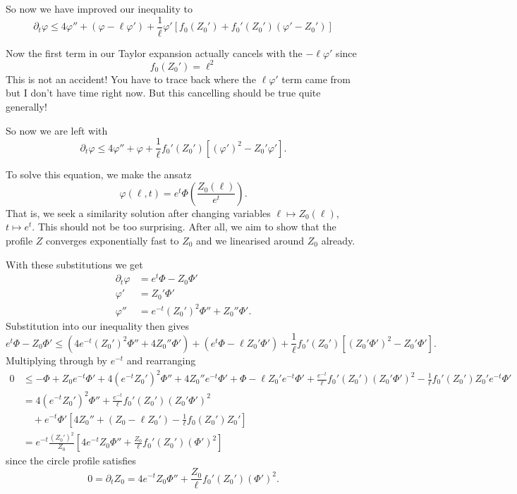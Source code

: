 \documentclass{amsart}
\begin{document}
So now we have improved our inequality to
\[
\partial_t \varphi \leq 4 \varphi'' + (\varphi - \ell \varphi') + \frac{1}{\ell} \varphi' \left[f_0(Z_0') + f_0'(Z_0')(\varphi' - Z_0')\right]
\]

Now the first term in our Taylor expansion actually cancels with the \(-\ell\varphi'\) since
\[
f_0(Z_0') = \ell^2
\]
This is not an accident! You have to trace back where the \(\ell\varphi'\) term came from but I don't have time right now. But this cancelling should be true quite generally!

So now we are left with
\[
\partial_t \varphi \leq 4 \varphi'' + \varphi + \frac{1}{\ell} f_0'(Z_0')[(\varphi')^2 - Z_0'\varphi'].
\]

To solve this equation, we make the ansatz
\[
\varphi(\ell, t) = e^t \Phi\left(\frac{Z_0(\ell)}{e^t}\right).
\]
That is, we seek a similarity solution after changing variables \(\ell \mapsto Z_0(\ell)\), \(t \mapsto e^t\). This should not be too surprising. After all, we aim to show that the profile \(Z\) converges exponentially fast to \(Z_0\) and we linearised around \(Z_0\) already.

With these substitutions we get
\begin{align*}
\partial_t \varphi &= e^t \Phi - Z_0 \Phi' \\
\varphi' &= Z_0' \Phi' \\
\varphi'' &= e^{-t} (Z_0')^2 \Phi'' + Z_0'' \Phi'.
\end{align*}
Substitution into our inequality then gives
\[
e^t \Phi - Z_0 \Phi' \leq (4 e^{-t} (Z_0')^2 \Phi'' + 4 Z_0'' \Phi') + (e^t \Phi - \ell Z_0' \Phi') + \frac{1}{\ell} f_0'(Z_0')[(Z_0' \Phi')^2 - Z_0'\Phi'].
\]
Multiplying through by \(e^{-t}\) and rearranging
\[
\begin{split}
0 &\leq -\Phi + Z_0 e^{-t} \Phi' + 4 (e^{-t} Z_0')^2 \Phi'' + 4 Z_0'' e^{-t} \Phi' + \Phi - \ell Z_0' e^{-t}\Phi'+ \frac{e^{-t}}{\ell} f_0'(Z_0')(Z_0' \Phi')^2 - \frac{1}{\ell} f_0'(Z_0') Z_0' e^{-t} \Phi' \\
&= 4 (e^{-t} Z_0')^2 \Phi'' + \frac{e^{-t}}{\ell} f_0'(Z_0') (Z_0' \Phi')^2 \\
&\quad + e^{-t}\Phi'\left[4Z_0'' + (Z_0 - \ell Z_0') - \frac{1}{\ell} f_0(Z_0') Z_0'\right] \\
&= e^{-t} \frac{(Z_0')^2}{Z_0} \left[4e^{-t}Z_0 \Phi'' + \frac{Z_0}{\ell} f_0'(Z_0') (\Phi')^2\right]
\end{split}
\]
since the circle profile satisfies
\[
0 = \partial_t Z_0 = 4e^{-t}Z_0 \Phi'' + \frac{Z_0}{\ell} f_0'(Z_0') (\Phi')^2.
\]
\end{document}
